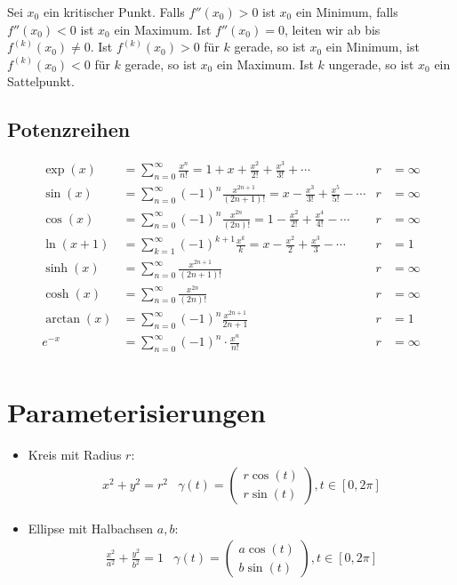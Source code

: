 \documentclass[a4paper,10pt]{article}
\def\sumk{\sum_{k=1}^\infty}
\def\sumn{\sum_{n=0}^\infty}
\begin{document}
Sei $x_0$ ein kritischer Punkt. Falls $f''(x_0) > 0$ ist $x_0$ ein Minimum, falls $f''(x_0) < 0$ ist $x_0$ ein Maximum. Ist $f''(x_0) = 0$, leiten wir ab bis $f^{(k)}(x_0) \neq 0$. Ist $f^{(k)}(x_0) > 0$ für $k$ gerade, so ist $x_0$ ein Minimum, ist $f^{(k)}(x_0) < 0$ für $k$ gerade, so ist $x_0$ ein Maximum. Ist $k$ ungerade, so ist $x_0$ ein Sattelpunkt.


\subsection{Potenzreihen}
\begin{align*}
\exp(x) &= \sumn \frac{x^n}{n!} = 1 + x + \frac{x^2}{2!} + \frac{x^3}{3!} + \cdots & r &= \infty \\
\sin(x) &= \sumn (-1)^n \frac{x^{2n + 1}}{(2n + 1)!} = x - \frac{x^3}{3!} + \frac{x^5}{5!} - \cdots & r &= \infty \\
\cos(x) &= \sumn (-1)^n \frac{x^{2n}}{(2n)!} = 1 - \frac{x^2}{2!} + \frac{x^4}{4!} - \cdots & r &= \infty \\
\ln(x + 1) &= \sumk (-1)^{k+1} \frac{x^k}{k} = x - \frac{x^2}{2} + \frac{x^3}{3} - \cdots & r &= 1 \\
\sinh(x) &= \sumn \frac{x^{2n+1}}{(2n+1)!} & r &= \infty \\
\cosh(x) &= \sumn \frac{x^{2n}}{(2n)!} & r &= \infty \\
\arctan(x) &= \sumn (-1)^n \frac{x^{2n+1}}{2n+1} & r &= 1 \\
e^{-x} &= \sumn (-1)^n \cdot \frac{x^n}{n!} & r &= \infty \\
\end{align*}

\section{Parameterisierungen}

\begin{itemize}
  \item Kreis mit Radius $r$:{
    \begin{align*} 
      & x^2 + y^2 = r^2 & \gamma(t) = \begin{pmatrix} r \cos(t) \\ r \sin(t) \end{pmatrix}, t \in [0, 2\pi] &
    \end{align*}
  }
  \item Ellipse mit Halbachsen $a, b$:{
    \begin{align*} 
      & \frac{x^2}{a^2} + \frac{y^2}{b^2} = 1 & \gamma(t) = \begin{pmatrix} a \cos(t) \\ b \sin(t) \end{pmatrix}, t \in [0, 2\pi] &
    \end{align*}
  }
\end{itemize}
\end{document}

